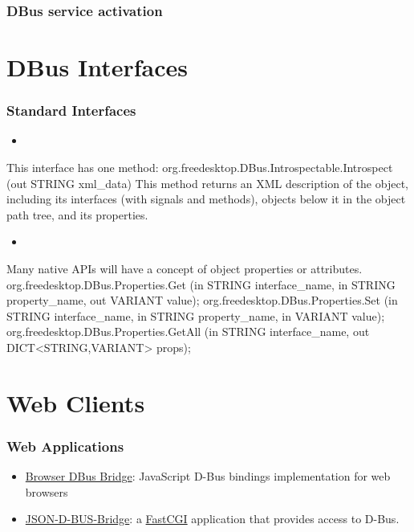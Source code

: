 \documentclass[xcolor=dvipsnames,compress]{beamer}
\newcommand\Fontvi{\fontsize{6}{7.2}\selectfont}
\newenvironment{vi}{%
    \Fontvi\verbatim}{\endverbatim}
\begin{document}
\begin{frame}
    \frametitle{DBus service activation}
\end{frame}

\section[design]{DBus Interfaces}

\begin{frame}[fragile]
    \frametitle{Standard Interfaces}
    \begin{itemize}
    \item {}
    \end{itemize}
    This interface has one method:
    \begin{vi}
        org.freedesktop.DBus.Introspectable.Introspect (out STRING xml_data)
    \end{vi}
    This method returns an XML description of the object, 
    including its interfaces (with signals and methods), objects below it in the object path tree, and its properties.
    
    \begin{itemize}
    \item {}
    \end{itemize}
    Many native APIs will have a concept of object properties or attributes. 
    \begin{vi}
        org.freedesktop.DBus.Properties.Get (in STRING interface_name,
                                            in STRING property_name,
                                            out VARIANT value);
        org.freedesktop.DBus.Properties.Set (in STRING interface_name,
                                            in STRING property_name,
                                            in VARIANT value);
        org.freedesktop.DBus.Properties.GetAll (in STRING interface_name,
                                            out DICT<STRING,VARIANT> props);
    \end{vi}
\end{frame}

\section[web]{Web Clients}

\begin{frame}
    \frametitle{Web Applications}
    \begin{itemize}
    \item\href{http://sandbox.movial.com/wiki/index.php/Browser_DBus_Bridge}
    {Browser DBus Bridge}: JavaScript D-Bus bindings implementation for web browsers
    \item\href{http://www.pengutronix.com/software/json-dbus-bridge/index_en.html}
    {JSON-D-BUS-Bridge}: a \href{http://www.fastcgi.com/devkit/doc/fastcgi-whitepaper/fastcgi.htm}{FastCGI} application that provides access to D-Bus.
    \end{itemize}
\end{frame}
\end{document}
